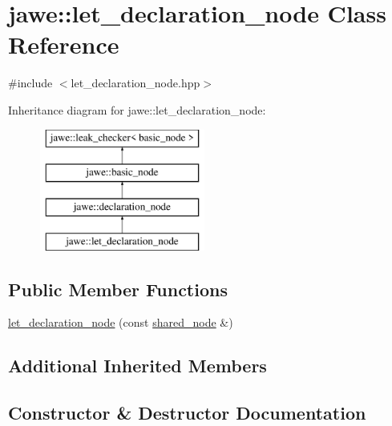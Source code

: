 \hypertarget{classjawe_1_1let__declaration__node}{}\section{jawe\+:\+:let\+\_\+declaration\+\_\+node Class Reference}
\label{classjawe_1_1let__declaration__node}


{\ttfamily \#include $<$let\+\_\+declaration\+\_\+node.\+hpp$>$}

Inheritance diagram for jawe\+:\+:let\+\_\+declaration\+\_\+node\+:\begin{figure}[H]
\begin{center}
\leavevmode
\includegraphics[height=4.000000cm]{classjawe_1_1let__declaration__node}
\end{center}
\end{figure}
\subsection*{Public Member Functions}
\begin{DoxyCompactItemize}
\item 
\hyperlink{classjawe_1_1let__declaration__node_a8a1d55182cfe06643bbd2c22a9e36d40}{let\+\_\+declaration\+\_\+node} (const \hyperlink{namespacejawe_a3f307481d921b6cbb50cc8511fc2b544}{shared\+\_\+node} \&)
\end{DoxyCompactItemize}
\subsection*{Additional Inherited Members}


\subsection{Constructor \& Destructor Documentation}
\mbox{\label{classjawe_1_1let__declaration__node_a8a1d55182cfe06643bbd2c22a9e36d40}} 
